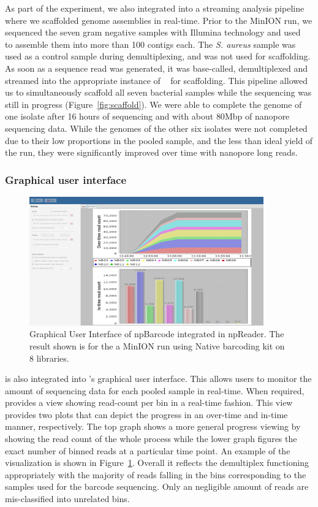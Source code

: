 As part of the experiment, we also integrated \npbarcode{} into a streaming analysis
pipeline where we scaffolded genome assemblies in real-time. Prior to the MinION run, we sequenced the seven gram negative samples with Illumina technology and used \spades{}~\cite{BankevichNA2012} to assemble them into
more than 100 contigs each. 
The \emph{S. aureus} sample was used as a control sample during 
demultiplexing, and was not used for scaffolding.
As soon as a sequence read was generated, it was base-called, demultiplexed and
streamed into the appropriate instance of \npscarf{}~\cite{Cao2017scaffolding} 
for scaffolding. This
pipeline allowed us to simultaneously scaffold all seven bacterial samples while
the sequencing was still in progress (Figure~\ref{fig:scaffold}). We were able 
to complete the genome of one \kp{} isolate after 16 hours of
sequencing and with about $80$Mbp of nanopore sequencing data. While the genomes of 
the other six isolates were not completed due to their low proportions in the 
pooled sample, and the less than ideal yield of the run, they were significantly
improved over time with nanopore long reads.

\subsubsection{Graphical user interface}

\begin{figure}[ht]
\centerline{\includegraphics[width=0.9\textwidth]{images/native2.png}}
\caption{Graphical User Interface of npBarcode integrated in npReader. The 
result shown is for the a MinION run using Native barcoding kit on 8 libraries.}
\label{fig:gui_npbarcode}
\end{figure}
\npbarcode{} is also integrated into \npreader{}'s graphical user interface. This allows users to monitor the amount of sequencing data for each pooled sample
in real-time. When required, \npreader{} provides a view showing read-count per bin 
in a real-time fashion. This view provides two plots that can depict the progress 
in an over-time and in-time manner, respectively. The top graph shows a more general progress viewing by showing the read count of the whole process 
while the lower graph figures the exact number of binned reads at a particular 
time point. An example of the visualization is shown in Figure~\ref{fig:gui_npbarcode}. 
Overall it reflects the 
demultiplex functioning appropriately with the majority of reads falling in the 
bins corresponding to the samples used for the barcode sequencing. Only an 
negligible  amount of reads are mis-classified into unrelated bins.

